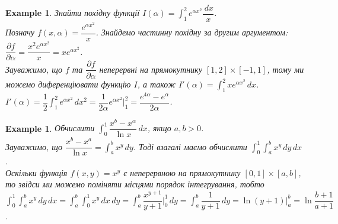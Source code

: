 \documentclass[a4paper, 10pt]{article}
\def\departial#1#2{\dfrac{\partial {#1}}{\partial {#2}}}
\def\huge{\displaystyle}
\theoremstyle{theoremdd}
\theoremstyle{theoremdd}
\theoremstyle{theoremdd}
\theoremstyle{theoremdd}
\theoremstyle{theoremdd}
\newtheorem{example}[theorem]{Example}
\theoremstyle{theoremdd}
\theoremstyle{theoremdd}
\theoremstyle{theoremdd}
\theoremstyle{theoremdd}
\begin{document}
\begin{example}
Знайти похідну функції $I(\alpha) = \huge\int_1^2 e^{\alpha x^2} \dfrac{\,dx}{x}$.\\
Позначу $f(x,\alpha) = \dfrac{e^{\alpha x^2}}{x}$. Знайдемо частинну похідну за другим аргументом: $\departial{f}{\alpha} = \dfrac{x^2 e^{\alpha x^2}}{x} = x e^{\alpha x^2}$.\\
Зауважимо, що $f$ та $\departial{f}{\alpha}$ неперервні на прямокутнику $[1,2] \times [-1,1]$, тому ми можемо диференціювати функцію $I$, а також $I'(\alpha) = \huge\int_1^2 x e^{\alpha x^2}\,dx$.\\
$I'(\alpha) = \huge \dfrac{1}{2} \int_1^2 e^{\alpha x^2}\,dx^2 = \dfrac{1}{2\alpha} e^{\alpha x^2} \Big|_1^2 = \dfrac{e^{4\alpha}-e^{\alpha}}{2\alpha}$.
\end{example}

\begin{example}
Обчислити $\huge\int_0^1 \dfrac{x^b - x^\alpha}{\ln x}\,dx$, якщо $a,b>0$.\\
Зауважимо, що $\dfrac{x^b - x^a}{\ln x} = \huge\int_a^b x^y\,dy$. Тоді взагалі маємо обчислити $\huge\int_0^1 \int_a^b x^y \,dy \,dx$.\\
Оскільки функція $f(x,y) = x^y$ є неперервною на прямокутнику $[0,1] \times [a,b]$, то звідси ми можемо поміняти місцями порядок інтегрування, тобто\\
$\huge\int_0^1 \int_a^b x^y \,dy \,dx = \int_a^b \int_0^1 x^y\,dx\,dy = \int_a^b \dfrac{x^{y+1}}{y+1}\Big|_0^1\,dy = \int_a^b \dfrac{1}{y+1}\,dy = \ln (y+1) \Big|_a^b = \ln \dfrac{b+1}{a+1}$.
\end{example}
\end{document}
